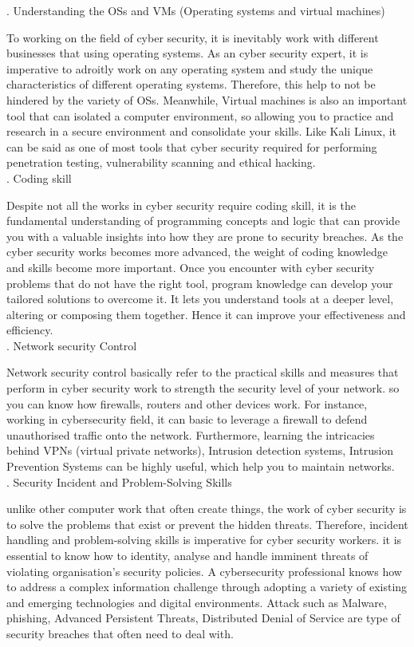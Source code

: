 \documentclass[a4paper, 11pt]{report}
\begin{document}
. Understanding the OSs and VMs (Operating systems and virtual machines)

\noindent To working on the field of cyber security, it is inevitably work with different businesses that using operating systems. As an cyber security expert, it is imperative to adroitly work on any operating system and study the unique characteristics of different operating systems. Therefore, this help to not be hindered by the variety of OSs. Meanwhile, Virtual machines is also an important tool that can isolated a computer environment, so allowing you to practice and research in a secure environment and consolidate your skills. Like Kali Linux, it can be said as one of most tools that cyber security required for performing penetration testing, vulnerability scanning and ethical hacking.\\

. Coding skill

\noindent Despite not all the works in cyber security require coding skill, it is the fundamental understanding of programming concepts and logic that can provide you with a valuable insights into how they are prone to security breaches. As the cyber security works becomes more advanced, the weight of coding knowledge and skills become more important. Once you encounter with cyber security problems that do not have the right tool, program knowledge can develop your tailored solutions to overcome it. It lets you understand tools at a deeper level, altering or composing them together. Hence it can improve your effectiveness and efficiency. \\

. Network security Control

Network security control basically refer to the practical skills and measures that perform in cyber security work to strength the security level of your network. so you can know how firewalls, routers and other devices work. For instance, working in cybersecurity field, it can basic to leverage a firewall to defend unauthorised traffic onto the network. Furthermore, learning the intricacies behind VPNs (virtual private networks), Intrusion detection systems, Intrusion Prevention Systems can be highly useful, which help you to maintain networks.\\

. Security Incident and Problem-Solving Skills 

\noindent unlike other computer work that often create things, the work of cyber security is to solve the problems that exist or prevent the hidden threats. Therefore, incident handling and problem-solving skills is imperative for cyber security workers. it is essential to know how to identity, analyse and handle imminent threats of violating organisation’s security policies. A cybersecurity professional knows how to address a complex information challenge through adopting a variety of existing and emerging technologies and digital environments. Attack such as Malware, phishing, Advanced Persistent Threats, Distributed Denial of Service are type of security breaches that often need to deal with.\\
\end{document}
